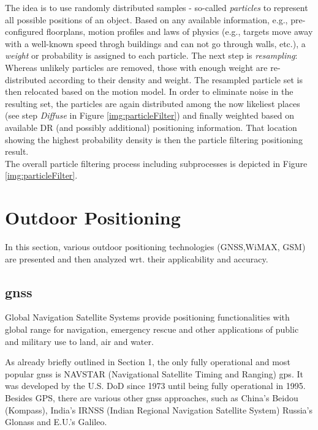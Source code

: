 The idea is to use randomly distributed samples - so-called \textit{particles} to represent all possible positions of an object. Based on any available information, e.g., pre-configured floorplans, motion profiles and laws of physics (e.g., targets move away with a well-known speed throgh buildings and can not go through walls, etc.), a \textit{weight} or probability is assigned to each particle. The next step is \textit{resampling}: Whereas unlikely particles are removed, those with enough weight are re-distributed according to their density and weight.
The resampled particle set is then relocated based on the motion model. In order to eliminate noise in the resulting set, the particles are again distributed among the now likeliest places (see step \emph{Diffuse} in Figure \ref{img:particleFilter}) and finally weighted based on available DR (and possibly additional) positioning information.
That location showing the highest probability density is then the particle filtering positioning result.\\

The overall particle filtering process including subprocesses is depicted in Figure \ref{img:particleFilter}.





\section{Outdoor Positioning}
In this section, various outdoor positioning technologies (GNSS,WiMAX, GSM) are presented and then analyzed wrt. their applicability and accuracy.

\subsection*{\ac{gnss}}

Global Navigation Satellite Systems provide positioning functionalities with global range for navigation, emergency rescue and other applications of public and military use to land, air and water.

As already briefly outlined in Section 1, the only fully operational and most popular \ac{gnss} is NAVSTAR (Navigational Satellite Timing and Ranging) \ac{gps}. It was developed by the U.S. DoD since 1973 until being fully operational in 1995. 
Besides GPS, there are various other \ac{gnss} approaches, such as China's Beidou (Kompass), India's IRNSS (Indian Regional Navigation Satellite System) Russia's Glonass and E.U.'s Galileo. \cite{heiseOnlineGPS}


